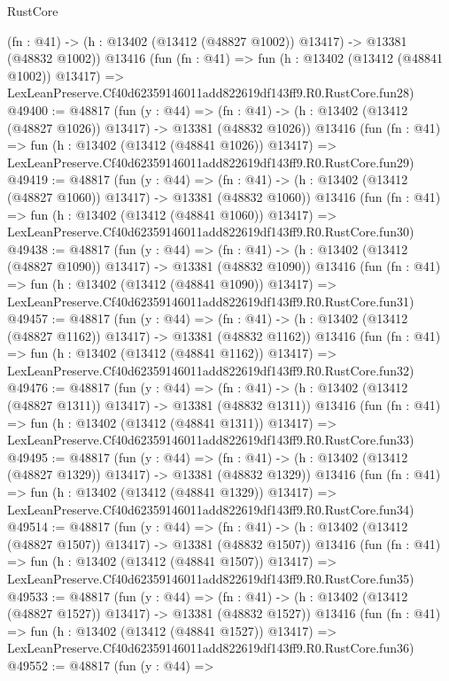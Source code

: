 \begin{lexlean}{RustCore}
\begin{coremodule}
    (fn : @41) -> (h : @13402 (@13412 (@48827 @1002)) @13417) -> @13381 (@48832 @1002))
    @13416
    (fun (fn : @41) =>
    fun (h : @13402 (@13412 (@48841 @1002)) @13417) =>
    LexLeanPreserve.Cf40d62359146011add822619df143ff9.R0.RustCore.fun28)
@49400 := @48817
    (fun (y : @44) =>
    (fn : @41) -> (h : @13402 (@13412 (@48827 @1026)) @13417) -> @13381 (@48832 @1026))
    @13416
    (fun (fn : @41) =>
    fun (h : @13402 (@13412 (@48841 @1026)) @13417) =>
    LexLeanPreserve.Cf40d62359146011add822619df143ff9.R0.RustCore.fun29)
@49419 := @48817
    (fun (y : @44) =>
    (fn : @41) -> (h : @13402 (@13412 (@48827 @1060)) @13417) -> @13381 (@48832 @1060))
    @13416
    (fun (fn : @41) =>
    fun (h : @13402 (@13412 (@48841 @1060)) @13417) =>
    LexLeanPreserve.Cf40d62359146011add822619df143ff9.R0.RustCore.fun30)
@49438 := @48817
    (fun (y : @44) =>
    (fn : @41) -> (h : @13402 (@13412 (@48827 @1090)) @13417) -> @13381 (@48832 @1090))
    @13416
    (fun (fn : @41) =>
    fun (h : @13402 (@13412 (@48841 @1090)) @13417) =>
    LexLeanPreserve.Cf40d62359146011add822619df143ff9.R0.RustCore.fun31)
@49457 := @48817
    (fun (y : @44) =>
    (fn : @41) -> (h : @13402 (@13412 (@48827 @1162)) @13417) -> @13381 (@48832 @1162))
    @13416
    (fun (fn : @41) =>
    fun (h : @13402 (@13412 (@48841 @1162)) @13417) =>
    LexLeanPreserve.Cf40d62359146011add822619df143ff9.R0.RustCore.fun32)
@49476 := @48817
    (fun (y : @44) =>
    (fn : @41) -> (h : @13402 (@13412 (@48827 @1311)) @13417) -> @13381 (@48832 @1311))
    @13416
    (fun (fn : @41) =>
    fun (h : @13402 (@13412 (@48841 @1311)) @13417) =>
    LexLeanPreserve.Cf40d62359146011add822619df143ff9.R0.RustCore.fun33)
@49495 := @48817
    (fun (y : @44) =>
    (fn : @41) -> (h : @13402 (@13412 (@48827 @1329)) @13417) -> @13381 (@48832 @1329))
    @13416
    (fun (fn : @41) =>
    fun (h : @13402 (@13412 (@48841 @1329)) @13417) =>
    LexLeanPreserve.Cf40d62359146011add822619df143ff9.R0.RustCore.fun34)
@49514 := @48817
    (fun (y : @44) =>
    (fn : @41) -> (h : @13402 (@13412 (@48827 @1507)) @13417) -> @13381 (@48832 @1507))
    @13416
    (fun (fn : @41) =>
    fun (h : @13402 (@13412 (@48841 @1507)) @13417) =>
    LexLeanPreserve.Cf40d62359146011add822619df143ff9.R0.RustCore.fun35)
@49533 := @48817
    (fun (y : @44) =>
    (fn : @41) -> (h : @13402 (@13412 (@48827 @1527)) @13417) -> @13381 (@48832 @1527))
    @13416
    (fun (fn : @41) =>
    fun (h : @13402 (@13412 (@48841 @1527)) @13417) =>
    LexLeanPreserve.Cf40d62359146011add822619df143ff9.R0.RustCore.fun36)
@49552 := @48817
    (fun (y : @44) =>

\end{coremodule}
\end{lexlean}
